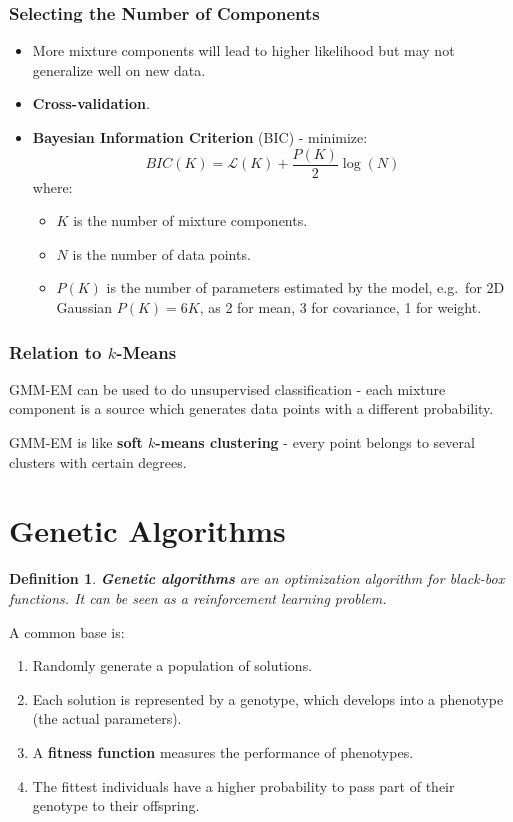 \documentclass[11pt]{article}
\newtheorem{defn}{Definition}
\begin{document}
\subsubsection{Selecting the Number of Components}
\begin{itemize}
  \item More mixture components will lead to higher likelihood but may not generalize well on new data.
  \item \textbf{Cross-validation}.
  \item \textbf{Bayesian Information Criterion} (BIC) - minimize:
    \[
      BIC(K) = \mathcal{L}(K) + \frac{P(K)}{2} \log(N) 
    \]
    where:
    \begin{itemize}
      \item $K$ is the number of mixture components.
      \item $N$ is the number of data points.
      \item $P(K)$ is the number of parameters estimated by the model, e.g.\ for 2D Gaussian $P(K) = 6K$, as 2 for mean, 3 for covariance, 1 for weight.
    \end{itemize}
\end{itemize}

\subsubsection{Relation to $k$-Means}
GMM-EM can be used to do unsupervised classification - each mixture component is a source which generates data points with a different probability.

GMM-EM is like \textbf{soft $k$-means clustering} - every point belongs to several clusters with certain degrees.

\section{Genetic Algorithms}
\begin{defn}
  \textbf{Genetic algorithms} are an optimization algorithm for black-box functions.
  It can be seen as a reinforcement learning problem.
\end{defn}

A common base is:
\begin{enumerate}
  \item Randomly generate a population of solutions.
  \item Each solution is represented by a genotype, which develops into a phenotype (the actual parameters).
  \item A \textbf{fitness function} measures the performance of phenotypes.
  \item The fittest individuals have a higher probability to pass part of their genotype to their offspring.
\end{enumerate}
\end{document}
